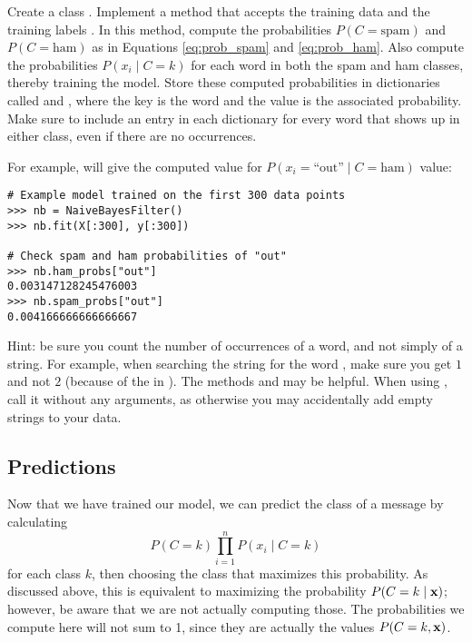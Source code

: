 \begin{problem}\label{prob:naivebayes:categorical-train}
Create a class .
Implement a method  that accepts the training data  and the training labels .
In this method, compute the probabilities $P(C=\text{spam})$ and $P(C=\text{ham})$ as in Equations \eqref{eq:prob_spam} and \eqref{eq:prob_ham}.
Also compute the probabilities $P(x_i \mid C=k)$ for each word in both the spam and ham classes, thereby training the model.
Store these computed probabilities in dictionaries called  and , where the key is the word and the value is the associated probability.
 Make sure to include an entry in each dictionary for every word that shows up in either class, even if there are no occurrences.

For example,  will give the computed value for $P(x_i=\text{``out''} \mid C=\text{ham})$ value:
\begin{lstlisting}
# Example model trained on the first 300 data points
>>> nb = NaiveBayesFilter()
>>> nb.fit(X[:300], y[:300])

# Check spam and ham probabilities of "out"
>>> nb.ham_probs["out"]
0.003147128245476003
>>> nb.spam_probs["out"]
0.004166666666666667
\end{lstlisting}

Hint: be sure you count the number of occurrences of a word, and not simply of a string. For example, when searching the string  for the word , make sure you get $1$ and not $2$ (because of the  in ).
The methods  and  may be helpful.
When using , call it without any arguments, as otherwise you may accidentally add empty strings to your data.
\end{problem}

\subsection*{Predictions}
Now that we have trained our model, we can predict the class of a message by calculating
\[
P(C=k)\prod_{i=1}^n P(x_i \mid C=k)
\]
for each class $k$, then choosing the class that maximizes this probability.
As discussed above, this is equivalent to maximizing the probability $P(C=k \mid \mathbf{x})$; however, be aware that we are not actually computing those.
The probabilities we compute here will not sum to 1, since they are actually the values $P(C=k,\mathbf{x})$.

